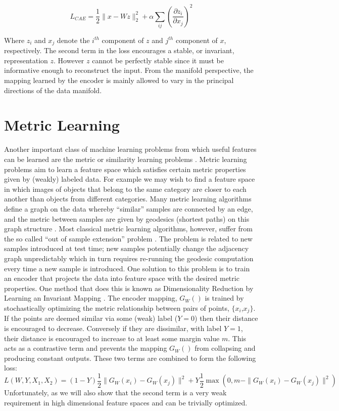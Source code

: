 \begin{equation} 
\nonumber 
L_{CAE} = \frac{1}{2} \|x - Wz \|_2 ^ 2 + \alpha \sum_{ij} \left(\frac{\partial z_i}{\partial x_j}\right)^2  
\end{equation}  

Where $z_i$ and $x_j$ denote the $i^{th}$ component of $z$ and $j^{th}$
component of $x$, respectively.  The second term in the loss encourages a
stable, or invariant, representation $z$. However $z$ cannot be perfectly
stable since it must be informative enough to reconstruct the input. From the
manifold perspective, the mapping learned by the encoder is mainly allowed to
vary in the principal directions of the data manifold.           

\section{Metric Learning}
Another important class of machine learning problems from which useful features
can be learned are the metric or similarity learning problems
\cite{tenenbaum2000,DrLIM}. Metric learning problems aim to learn a feature
space which satisfies certain metric properties given by (weakly) labeled data.
For example we may wish to find a feature space in which images of objects that
belong to the same category are closer to each another than objects from
different categories. Many metric learning algorithms define a graph on the
data whereby ``similar'' samples are connected by an edge, and the metric
between samples are given by geodesics (shortest paths) on this graph structure
\cite{tenenbaum2000, coifman2006}. Most classical metric learning algorithms,
however, suffer from the so called ``out of sample extension'' problem
\cite{bengio2004out,coifman2006geometric}. The problem is related to new samples 
introduced at test time; new samples potentially change the adjacency graph 
unpredictably which in turn requires re-running the geodesic computation every
time a new sample is introduced. One solution to this problem is to train an
encoder that projects the data into feature space with the desired metric
properties. One method that does this is known as Dimensionality Reduction by
Learning an Invariant Mapping \cite{DrLIM}. The encoder mapping, $G_W()$ is
trained by stochastically optimizing the metric relationship between pairs of
points, $\{x_i$,$x_j\}$.  If the points are deemed similar via some (weak)
label ($Y=0$) then their distance is encouraged to decrease. Conversely if they
are dissimilar, with label $Y=1$, their distance is encouraged to increase to
at least some margin value $m$. This acts as a contrastive term and prevents 
the mapping $G_W()$ from collapsing and producing constant outputs. These two 
terms are combined to form the following loss:            
\begin{equation} 
L(W,Y,X_1,X_2) = (1-Y)\frac{1}{2}\|G_W(x_i)-G_W(x_j)\|^2 + Y \frac{1}{2}\max(0,m-\|G_W(x_i)-G_W(x_j)\|^2)  
\end{equation}  
Unfortunately, as we will also show that the second term is a very weak
requirement in high dimensional feature spaces and can be trivially 
optimized. 
